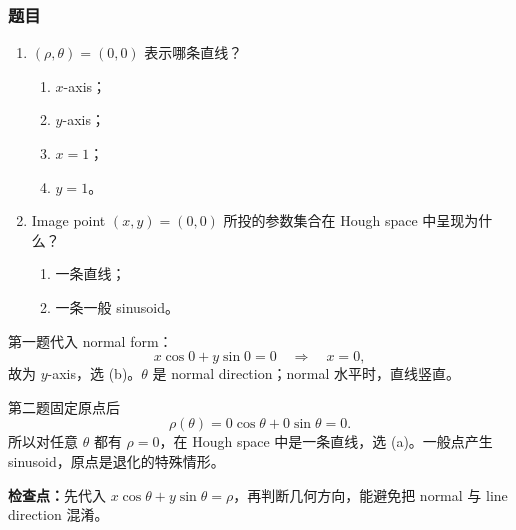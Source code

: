 \subsubsection*{题目}

\begin{enumerate}
  \item $(\rho,\theta)=(0,0)$ 表示哪条直线？
  \begin{enumerate}
    \item $x$-axis；\item $y$-axis；\item $x=1$；\item $y=1$。
  \end{enumerate}
  \item Image point $(x,y)=(0,0)$ 所投的参数集合在 Hough space 中呈现为什么？
  \begin{enumerate}
    \item 一条直线；\item 一条一般 sinusoid。
  \end{enumerate}
\end{enumerate}

\begin{checkedsolution}
第一题代入 normal form：
\[
  x\cos0+y\sin0=0\quad\Longrightarrow\quad x=0,
\]
故为 $y$-axis，选 (b)。$\theta$ 是 normal direction；normal 水平时，直线竖直。

第二题固定原点后
\[
  \rho(\theta)=0\cos\theta+0\sin\theta=0.
\]
所以对任意 $\theta$ 都有 $\rho=0$，在 Hough space 中是一条直线，选 (a)。一般点产生 sinusoid，原点是退化的特殊情形。
\end{checkedsolution}

\textbf{检查点：}先代入 $x\cos\theta+y\sin\theta=\rho$，再判断几何方向，能避免把 normal 与 line direction 混淆。
